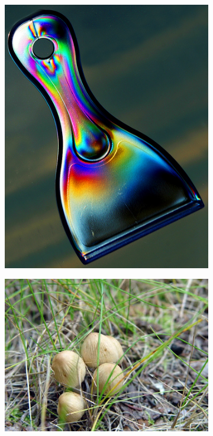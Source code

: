 \documentclass[journal, a4paper]{IEEEtran}
\begin{document}
\begin{figure}[h]
    \begin{subfigure}{.25\textwidth}
      \centering
      \includegraphics[width=.8\linewidth]{../data/IMG_5}
      \caption{}
      \label{fig:e}
    \end{subfigure}%
    \begin{subfigure}{.25\textwidth}
      \centering
      \includegraphics[width=.8\linewidth]{../data/IMG_6}
      \caption{}
      \label{fig:f}
    \end{subfigure}


\end{figure}
\end{document}
